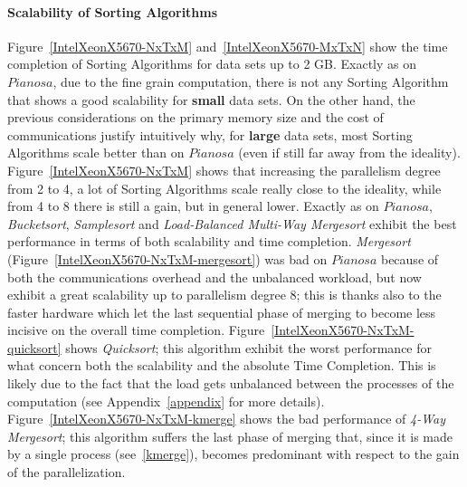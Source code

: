 \paragraph{Scalability of Sorting Algorithms} Figure~\ref{IntelXeonX5670-NxTxM} and~\ref{IntelXeonX5670-MxTxN} show the time completion of Sorting Algorithms for data sets up to 2 GB. Exactly as on $Pianosa$, due to the fine grain computation, there is not any Sorting Algorithm that shows a good scalability for \textbf{small} data sets. On the other hand, the previous considerations on the primary memory size and the cost of communications justify intuitively why, for \textbf{large} data sets, most Sorting Algorithms scale better than on $Pianosa$ (even if still far away from the ideality). Figure~\ref{IntelXeonX5670-NxTxM} shows that increasing the parallelism degree from 2 to 4, a lot of Sorting Algorithms scale really close to the ideality, while from 4 to 8 there is still a gain, but in general lower. Exactly as on $Pianosa$, \textit{Bucketsort}, \textit{Samplesort} and \textit{Load-Balanced Multi-Way Mergesort} exhibit the best performance in terms of both scalability and time completion. \textit{Mergesort} (Figure~\ref{IntelXeonX5670-NxTxM-mergesort}) was bad on $Pianosa$ because of both the communications overhead and the unbalanced workload, but now exhibit a great scalability up to parallelism degree 8; this is thanks also to the faster hardware which let the last sequential phase of merging to become less incisive on the overall time completion. Figure~\ref{IntelXeonX5670-NxTxM-quicksort} shows \textit{Quicksort}; this algorithm exhibit the worst performance for what concern both the scalability and the absolute Time Completion. This is likely due to the fact that the load gets unbalanced between the processes of the computation (see Appendix~\ref{appendix} for more details). Figure~\ref{IntelXeonX5670-NxTxM-kmerge} shows the bad performance of \textit{4-Way Mergesort}; this algorithm suffers the last phase of merging that, since it is made by a single process (see~\ref{kmerge}), becomes predominant with respect to the gain of the parallelization. 




